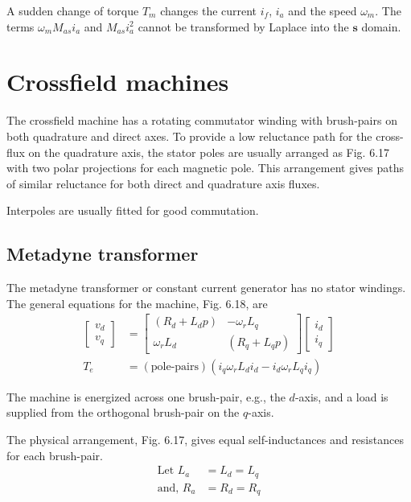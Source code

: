 \documentclass[a4paper,numbers=noenddot,12pt]{scrbook}
\begin{document}
A sudden change of torque $T_m$ changes the current $i_f$, $i_a$ and the speed $\omega_m$. The terms $\omega_m M_{as} i_a$ and $M_{as}i_a^2$ cannot be transformed by Laplace into the $\textbf{s}$ domain.

\section{Crossfield machines}
The crossfield machine has a rotating commutator winding with brush-pairs on both quadrature and direct axes. To provide a low reluctance path for the cross-flux on the quadrature axis, the stator poles are usually arranged as Fig. 6.17 with two polar projections for each magnetic pole. This arrangement gives paths of similar reluctance for both direct and quadrature axis fluxes.

Interpoles are usually fitted for good commutation.

\subsection{Metadyne transformer} The metadyne transformer or constant current generator has no stator windings. The general equations for the machine, Fig. 6.18, are
\begin{align}
    \begin{bmatrix}
        v_d \\ v_q
    \end{bmatrix}
    & = 
    \begin{bmatrix}
        (R_d + L_d p) & - \omega_r L_q \\
        \omega_r L_d & (R_q + L_q p)
    \end{bmatrix}
    \begin{bmatrix}
        i_d \\ i_q
    \end{bmatrix} \\
    T_e & = (\text{pole-pairs})(i_q \omega_r L_d i_d - i_d \omega_r L_q i_q) 
    \label{eq:Eq6.77}
\end{align}

The machine is energized across one brush-pair, e.g., the $d$-axis, and a load is supplied from the orthogonal brush-pair on the $q$-axis.

The physical arrangement, Fig. 6.17, gives equal self-inductances and resistances for each brush-pair.
\begin{align*}
    \text{Let } L_a & = L_d = L_q \\
    \text{and, } R_a & = R_d = R_q 
    \label{}
\end{align*}
\end{document}
